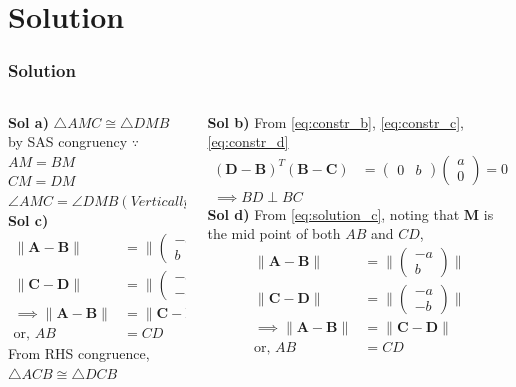 \documentclass{beamer}
\providecommand{\brak}[1]{\ensuremath{\left(#1\right)}}
\theoremstyle{remark}
\providecommand{\norm}[1]{\lVert#1\rVert}
\newcommand{\myvec}[1]{\ensuremath{\begin{pmatrix}#1\end{pmatrix}}}
\let\vec\mathbf
\numberwithin{equation}{section}
\begin{document}
\section*{\textbf{Solution}}
\begin{frame}[fragile]
\frametitle{Solution}
\footnotesize
\label{abcd}
\begin{columns}
\begin{column}{0.5\textwidth}
\textbf{Sol a)}
$\triangle AMC \cong \triangle DMB$  by SAS congruency 
$\because$
\\
$AM = BM$
\\
$CM = DM$
\\
$\angle{AMC} = \angle{DMB}( Vertically Opposite Angles)$
\\
\textbf{Sol c)}
\begin{align}
\norm{\vec{A}-\vec{B}} &= \norm{\myvec{-a \\ b}}
\\
\norm{\vec{C}-\vec{D}} &= \norm{\myvec{-a \\ -b}}
\\
\implies \norm{\vec{A}-\vec{B}} &= \norm{\vec{C}-\vec{D}}\\
\label{eq:solution_c}
\text{or, } AB &=CD
\end{align}
From RHS congruence,  $\triangle ACB \cong  \triangle DCB$
\end{column}
\begin{column}{0.5\textwidth}
\textbf{Sol b)}
From \eqref{eq:constr_b}, \eqref{eq:constr_c}, \eqref{eq:constr_d}
\begin{align}
\brak{\vec{D}-\vec{B}}^T
\brak{\vec{B}-\vec{C}} &= \myvec{0 & b}\myvec{a \\ 0} = 0
\\
\implies BD \perp BC
\end{align}
\textbf{Sol d)}
From \eqref{eq:solution_c}, noting that $\vec{M}$ is the mid point of both $AB$ and $CD$, 
\begin{align}
\norm{\vec{A}-\vec{B}} &= \norm{\myvec{-a \\ b}}
\\
\norm{\vec{C}-\vec{D}} &= \norm{\myvec{-a \\ -b}}
\\
\implies \norm{\vec{A}-\vec{B}} &= \norm{\vec{C}-\vec{D}}\\
\text{or, } AB &=CD
\end{align}
\end{column}
\end{columns}
\end{frame}
\end{document}
